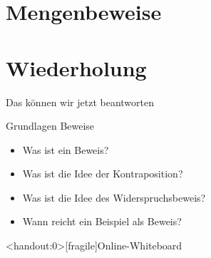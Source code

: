 




\section{Mengenbeweise}






\section{Wiederholung}
\begin{frame}[fragile]{Das können wir jetzt beantworten}
    \begin{alertblock}{Grundlagen Beweise}
    \begin{itemize}
        \item Was ist ein Beweis?
        \item Was ist die Idee der Kontraposition?
        \item Was ist die Idee des Widerspruchsbeweis?
        \item Wann reicht ein Beispiel als Beweis?
    \end{itemize}
    \end{alertblock}
\end{frame}




\appendix

\begin{frame}<handout:0>[fragile]{Online-Whiteboard}
	\phantom{text}
\end{frame}


